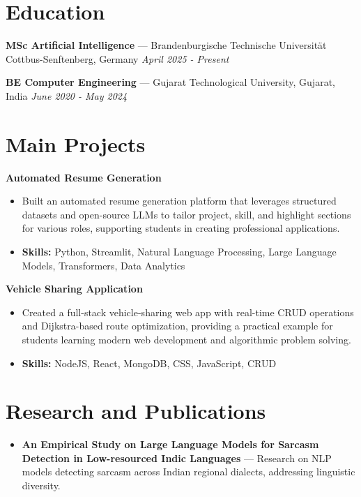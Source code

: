 \documentclass[a4paper,10pt]{article}
\begin{document}
\section*{Education}
\textbf{MSc Artificial Intelligence} — Brandenburgische Technische Universität Cottbus-Senftenberg, Germany \hfill \textit{April 2025 - Present}\par
\vspace{1.5pt}
\textbf{BE Computer Engineering} — Gujarat Technological University, Gujarat, India \hfill \textit{June 2020 - May 2024}\par

\section*{Main Projects}
\textbf{Automated Resume Generation}\par
\vspace{1pt}
\begin{itemize}
  \item Built an automated resume generation platform that leverages structured datasets and open-source LLMs to tailor project, skill, and highlight sections for various roles, supporting students in creating professional applications.
  \item \textbf{Skills:} Python, Streamlit, Natural Language Processing, Large Language Models, Transformers, Data Analytics
\end{itemize}
\vspace{3pt}
\textbf{Vehicle Sharing Application}\par
\vspace{1pt}
\begin{itemize}
  \item Created a full-stack vehicle-sharing web app with real-time CRUD operations and Dijkstra-based route optimization, providing a practical example for students learning modern web development and algorithmic problem solving.
  \item \textbf{Skills:} NodeJS, React, MongoDB, CSS, JavaScript, CRUD
\end{itemize}

\section*{Research and Publications}
\begin{itemize}
\item \textbf{An Empirical Study on Large Language Models for Sarcasm Detection in Low-resourced Indic Languages} — Research on NLP models detecting sarcasm across Indian regional dialects, addressing linguistic diversity.
\end{itemize}
\end{document}
